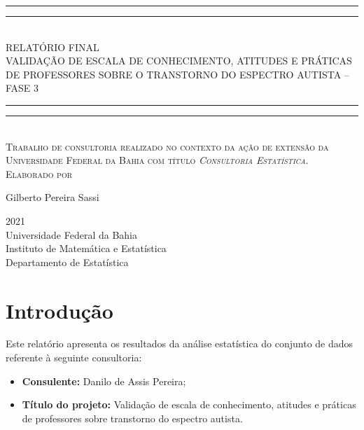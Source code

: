 \documentclass[
]{article}
\author{}
\date{\vspace{-2.5em}}
\providecommand{\tightlist}{%
  \setlength{\itemsep}{0pt}\setlength{\parskip}{0pt}}
\newlength{\drop}
\begin{document}
\onehalfspacing

\begin{titlepage}
    \textheight
    \centering
    \vspace*{\baselineskip}
    \rule{\textwidth}{1.6pt}\vspace*{-\baselineskip}\vspace*{2pt}
    \rule{\textwidth}{0.4pt}\\[\baselineskip]
    {\LARGE RELATÓRIO FINAL \\ 
    \vspace*{\baselineskip}
    VALIDAÇÃO DE ESCALA DE CONHECIMENTO, ATITUDES E PRÁTICAS DE PROFESSORES SOBRE O TRANSTORNO DO ESPECTRO AUTISTA -- FASE 3}\\[0.2\baselineskip]
    \rule{\textwidth}{0.4pt}\vspace*{-\baselineskip}\vspace{3.2pt}
    \rule{\textwidth}{1.6pt}\\[\baselineskip]
    \scshape
    Trabalho de consultoria realizado no contexto da ação de extensão da Universidade Federal da Bahia com título \textit{Consultoria Estatística}. \\
    \vspace*{2\baselineskip}
    Elaborado por \\[\baselineskip]
    {\Large Gilberto Pereira Sassi\par}
    \vfill
    {\scshape 2021} \\
    {\large Universidade Federal da Bahia}\\
    {\large Instituto de Matemática e Estatística}\\
    {\large Departamento de Estatística}\par
  \end{titlepage}

\newpage

\tableofcontents

\newpage

\hypertarget{introduuxe7uxe3o}{%
\section{Introdução}\label{introduuxe7uxe3o}}

Este relatório apresenta os resultados da análise estatística do conjunto de dados referente à seguinte consultoria:

\begin{itemize}
\tightlist
\item
  \textbf{Consulente:} Danilo de Assis Pereira;
\item
  \textbf{Título do projeto:} Validação de escala de conhecimento, atitudes e práticas de professores sobre transtorno do espectro autista.
\end{itemize}
\end{document}
